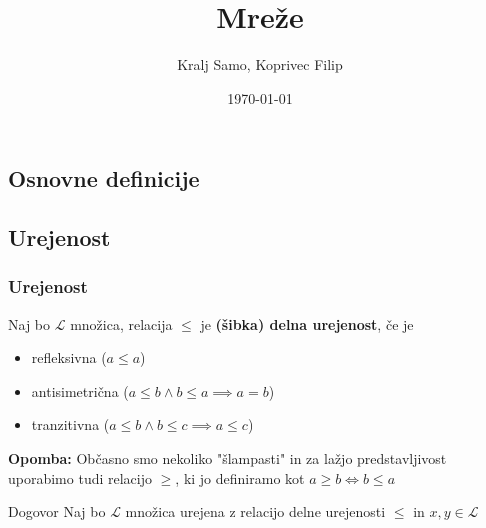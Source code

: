 \documentclass[slovene]{beamer}
\author{Kralj Samo, Koprivec Filip}
\title{Mreže}
\institute{FMF}
\date{\today}
\newenvironment{remark}
{\textbf{Opomba:}}
{}
\begin{document}
\begin{frame}
	\titlepage
\end{frame}

\begin{frame}
	\tableofcontents
\end{frame}

\begin{frame}
\section{Osnovne definicije}
\subsection{Urejenost}
\frametitle{Urejenost}

\begin{definition}
Naj bo $\mathcal{L}$ množica, relacija $\leq$ je \textbf{(šibka) delna urejenost}, če je
\begin{itemize}
\item refleksivna ($a \leq a$)
\item antisimetrična ($a \leq b \land b \leq a \implies a = b$)
\item tranzitivna ($a \leq b \land b \leq c \implies a \leq c$)
\end{itemize}
\end{definition}

\begin{remark}
Občasno smo nekoliko "šlampasti" in za lažjo predstavljivost uporabimo tudi relacijo $\geq$, ki jo definiramo kot $a \geq b \iff b \leq a$
\end{remark}

\begin{block}{Dogovor}
Naj bo $\mathcal{L}$ množica urejena z relacijo delne urejenosti $\leq$ in $x,y \in \mathcal{L}$
\end{block}

\end{frame}
\end{document}

